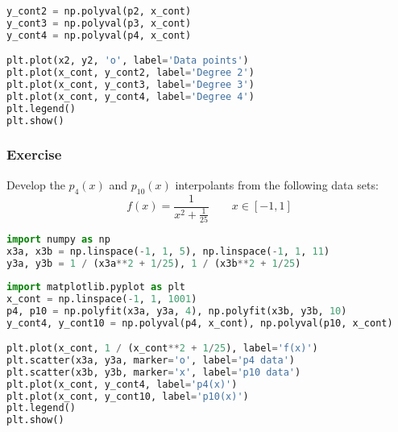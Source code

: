 \begin{frame}[fragile]
\begin{lstlisting}[language=Python,basicstyle=\tiny]
y_cont2 = np.polyval(p2, x_cont)
y_cont3 = np.polyval(p3, x_cont)
y_cont4 = np.polyval(p4, x_cont)

plt.plot(x2, y2, 'o', label='Data points')
plt.plot(x_cont, y_cont2, label='Degree 2')
plt.plot(x_cont, y_cont3, label='Degree 3')
plt.plot(x_cont, y_cont4, label='Degree 4')
plt.legend()
plt.show()
   \end{lstlisting}
\end{frame}


\begin{frame}[fragile]
  \frametitle{Exercise}
  \footnotesize\selectfont
  Develop the {$p_4(x)$} and {$p_{10}(x)$} interpolants from the following data sets: 
  \vspace*{1em}
\[
f(x)=\frac{1}{x^2+\frac{1}{25}} \qquad x \in [-1,1]
\]
     \begin{lstlisting}[language=Python]
import numpy as np
x3a, x3b = np.linspace(-1, 1, 5), np.linspace(-1, 1, 11)
y3a, y3b = 1 / (x3a**2 + 1/25), 1 / (x3b**2 + 1/25)
     \end{lstlisting}
    \begin{tikzpicture}[domain=-1:1,xscale=2,yscale=0.1]
    \end{tikzpicture}
  \vspace*{-1ex}
  \begin{lstlisting}[language=Python, basicstyle=\scriptsize]
import matplotlib.pyplot as plt
x_cont = np.linspace(-1, 1, 1001)
p4, p10 = np.polyfit(x3a, y3a, 4), np.polyfit(x3b, y3b, 10)
y_cont4, y_cont10 = np.polyval(p4, x_cont), np.polyval(p10, x_cont)

plt.plot(x_cont, 1 / (x_cont**2 + 1/25), label='f(x)')
plt.scatter(x3a, y3a, marker='o', label='p4 data')
plt.scatter(x3b, y3b, marker='x', label='p10 data')
plt.plot(x_cont, y_cont4, label='p4(x)')
plt.plot(x_cont, y_cont10, label='p10(x)')
plt.legend()
plt.show()
  \end{lstlisting}
\end{frame}


